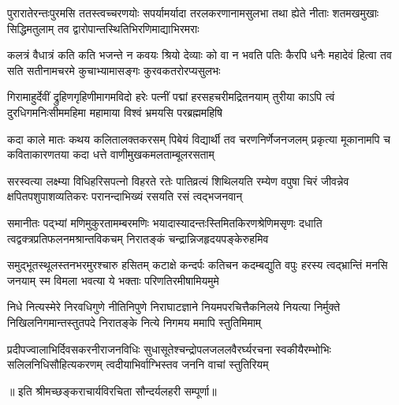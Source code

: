\fourlineindentedshloka
{पुरारातेरन्तःपुरमसि ततस्त्वच्चरणयोः}
{सपर्यामर्यादा तरलकरणानामसुलभा}
{तथा ह्येते नीताः शतमखमुखाः सिद्धिमतुलाम्}
{तव द्वारोपान्तस्थितिभिरणिमाद्याभिरमराः}%

\fourlineindentedshloka
{कलत्रं वैधात्रं कति कति भजन्ते न कवयः}
{श्रियो देव्याः को वा न भवति पतिः कैरपि धनैः}
{महादेवं हित्वा तव सति सतीनामचरमे}
{कुचाभ्यामासङ्गः कुरवकतरोरप्यसुलभः}%

\fourlineindentedshloka
{गिरामाहुर्देवीं द्रुहिणगृहिणीमागमविदो}
{हरेः पत्नीं पद्मां हरसहचरीमद्रितनयाम्}
{तुरीया काऽपि त्वं दुरधिगमनिःसीममहिमा}
{महामाया विश्वं भ्रमयसि परब्रह्ममहिषि}%

\fourlineindentedshloka
{कदा काले मातः कथय कलितालक्तकरसम्}
{पिबेयं विद्यार्थी तव चरणनिर्णेजनजलम्}
{प्रकृत्या मूकानामपि च कविताकारणतया}
{कदा धत्ते वाणीमुखकमलताम्बूलरसताम्}%

\fourlineindentedshloka
{सरस्वत्या लक्ष्म्या विधिहरिसपत्नो विहरते}
{रतेः पातिव्रत्यं शिथिलयति रम्येण वपुषा}
{चिरं जीवन्नेव क्षपितपशुपाशव्यतिकरः}
{परानन्दाभिख्यं रसयति रसं त्वद्भजनवान्}%

\fourlineindentedshloka
{समानीतः पद्‌भ्यां मणिमुकुरतामम्बरमणिः}
{भयादास्यादन्तःस्तिमितकिरणश्रेणिमसृणः}
{दधाति त्वद्वक्त्रप्रतिफलनमश्रान्तविकचम्}
{निरातङ्कं चन्द्रान्निजहृदयपङ्केरुहमिव}%

\fourlineindentedshloka
{समुद्भूतस्थूलस्तनभरमुरश्चारु हसितम्}
{कटाक्षे कन्दर्पः कतिचन कदम्बद्युति वपुः}
{हरस्य त्वद्भ्रान्तिं मनसि जनयाम् स्म विमला}
{भवत्या ये भक्ताः परिणतिरमीषामियमुमे}%

\fourlineindentedshloka
{निधे नित्यस्मेरे निरवधिगुणे नीतिनिपुणे}
{निराघाटज्ञाने नियमपरचित्तैकनिलये}
{नियत्या निर्मुक्ते निखिलनिगमान्तस्तुतपदे}
{निरातङ्के नित्ये निगमय ममापि स्तुतिमिमाम्}%

\fourlineindentedshloka
{प्रदीपज्वालाभिर्दिवसकरनीराजनविधिः}
{सुधासूतेश्चन्द्रोपलजललवैरर्घ्यरचना}
{स्वकीयैरम्भोभिः सलिलनिधिसौहित्यकरणम्}
{त्वदीयाभिर्वाग्भिस्तव जननि वाचां स्तुतिरियम्}%

{॥ इति श्रीमच्छङ्कराचार्यविरचिता सौन्दर्यलहरी सम्पूर्णा॥}